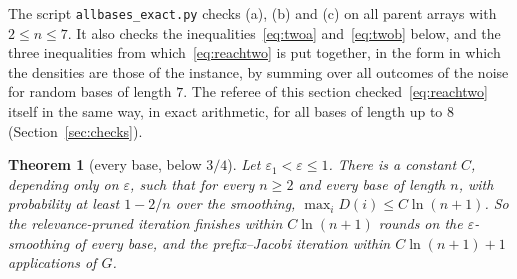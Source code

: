 \documentclass[11pt]{amsart}
\newtheorem{theorem}{Theorem}
\theoremstyle{definition}
\theoremstyle{remark}
\newcommand{\eps}{\varepsilon}
\begin{document}
\noindent The script \texttt{allbases\_exact.py} checks (a), (b) and (c) on all parent arrays with
$2\le n\le7$. It also checks the inequalities~\eqref{eq:twoa} and~\eqref{eq:twob} below, and the
three inequalities from which~\eqref{eq:reachtwo} is put together, in the form in which the
densities are those of the instance, by summing over all outcomes of the noise for random bases
of length $7$. The referee of this section checked~\eqref{eq:reachtwo} itself in the same way, in
exact arithmetic, for all bases of length up to $8$ (Section~\ref{sec:checks}).

\begin{theorem}[every base, below $3/4$]\label{thm:allbases}
Let $\eps_1<\eps\le1$. There is a constant $C$, depending only on $\eps$, such that for every
$n\ge2$ and every base of length $n$, with probability at least $1-2/n$ over the smoothing,
$\max_iD(i)\le C\ln(n+1)$. So the relevance-pruned iteration finishes within $C\ln(n+1)$ rounds
on the $\eps$-smoothing of every base, and the prefix--Jacobi iteration within $C\ln(n+1)+1$
applications of $G$.
\end{theorem}
\end{document}

